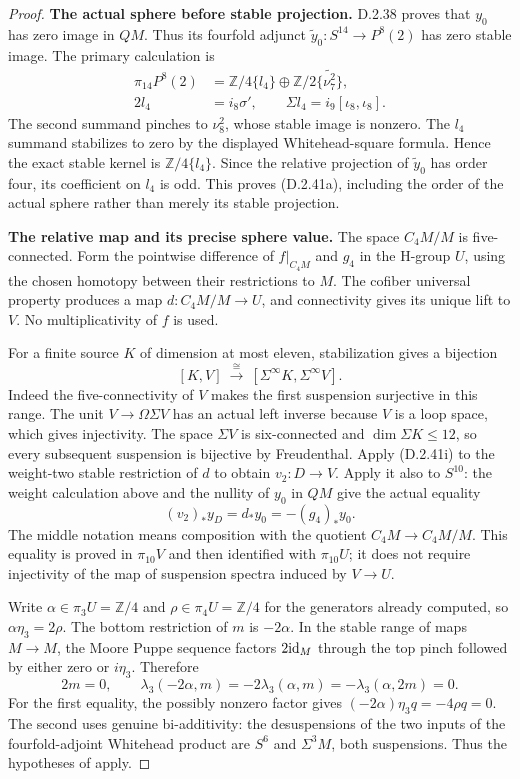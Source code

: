 \begin{proof}
\medskip\noindent
\textbf{The actual sphere before stable projection.}
D.2.38 proves that $y_0$ has zero image in $QM$. Thus its
fourfold adjunct $\widetilde y_0:S^{14}\to P^8(2)$ has zero
stable image. The primary calculation
\cite[Lemmas~2.7 and~2.8(ii), p.~523]{EH5MorisugiMukai2000}
is
\[
\begin{split}
 \pi_{14}P^8(2)&=\mathbb Z/4\{l_4\}
       \oplus\mathbb Z/2\{\widetilde{\nu_7^2}\},\\
 2l_4&=i_8\sigma',\qquad
 \Sigma l_4=i_9[\iota_8,\iota_8].
\end{split}
 \tag{D.2.41h}
\]
The second summand pinches to $\nu_8^2$, whose stable image is
nonzero. The $l_4$ summand stabilizes to zero by the displayed
Whitehead-square formula. Hence the exact stable kernel is
$\mathbb Z/4\{l_4\}$. Since the relative projection of
$\widetilde y_0$ has order four, its coefficient on $l_4$ is
odd. This proves \textup{(D.2.41a)}, including the order of
the actual sphere rather than merely its stable projection.

\medskip\noindent
\textbf{The relative map and its precise sphere value.}
The space $C_4M/M$ is five-connected. Form the pointwise
difference of $f|_{C_4M}$ and $g_4$ in the H-group $U$,
using the chosen homotopy between their restrictions to $M$.
The cofiber universal property produces a map
$d:C_4M/M\to U$, and connectivity gives its unique lift
to $V$. No multiplicativity of $f$ is used.

For a finite source $K$ of dimension at most eleven, stabilization
gives a bijection
\[
 [K,V]\ \xrightarrow{\ \cong\ }\
 [\Sigma^\infty K,\Sigma^\infty V].
 \tag{D.2.41i}
\]
Indeed the five-connectivity of $V$ makes the first suspension
surjective in this range. The unit $V\to\Omega\Sigma V$
has an actual left inverse because $V$ is a loop space, which
gives injectivity. The space $\Sigma V$ is six-connected and
$\dim\Sigma K\leq12$, so every subsequent suspension is
bijective by Freudenthal. Apply \textup{(D.2.41i)} to the
weight-two stable restriction of $d$ to obtain $v_2:D\to V$.
Apply it also to $S^{10}$: the weight calculation above and
the nullity of $y_0$ in $QM$ give the actual equality
\[
 (v_2)_*y_D=d_*y_0=-(g_4)_*y_0.
 \tag{D.2.41j}
\]
The middle notation means composition with the quotient
$C_4M\to C_4M/M$. This equality is proved in $\pi_{10}V$
and then identified with $\pi_{10}U$; it does not require
injectivity of the map of suspension spectra induced by
$V\to U$.

Write $\alpha\in\pi_3U=\mathbb Z/4$ and
$\rho\in\pi_4U=\mathbb Z/4$ for the generators already
computed, so $\alpha\eta_3=2\rho$. The bottom restriction
of $m$ is $-2\alpha$. In the stable range of maps $M\to M$,
the Moore Puppe sequence factors $2\mathrm{id}_M$ through the top
pinch followed by either zero or $i\eta_3$. Therefore
\[
 2m=0,
 \qquad
 \lambda_3(-2\alpha,m)
   =-2\lambda_3(\alpha,m)
   =-\lambda_3(\alpha,2m)=0.
 \tag{D.2.41k}
\]
For the first equality, the possibly nonzero factor gives
$(-2\alpha)\eta_3q=-4\rho q=0$. The second uses genuine
bi-additivity: the desuspensions of the two inputs of the
fourfold-adjoint Whitehead product are $S^6$ and $\Sigma^3M$,
both suspensions. Thus the hypotheses of
\cite[Proposition~3.4, p.~14]{EH5Arkowitz1962} apply.


\end{proof}
